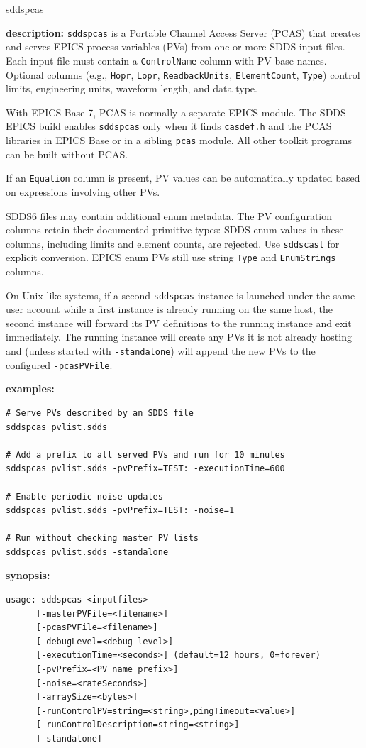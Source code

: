 %
%
\begin{sddsprog}{sddspcas}
\item \textbf{description:}
\verb+sddspcas+ is a Portable Channel Access Server (PCAS) that creates and serves EPICS process variables (PVs)
from one or more SDDS input files. Each input file must contain a \verb+ControlName+ column with PV base names.
Optional columns (e.g., \verb+Hopr+, \verb+Lopr+, \verb+ReadbackUnits+, \verb+ElementCount+, \verb+Type+) control
limits, engineering units, waveform length, and data type.

With EPICS Base 7, PCAS is normally a separate EPICS module. The SDDS-EPICS
build enables \verb+sddspcas+ only when it finds \verb+casdef.h+ and the PCAS
libraries in EPICS Base or in a sibling \verb+pcas+ module. All other toolkit
programs can be built without PCAS.

If an \verb+Equation+ column is present, PV values can be automatically updated based on expressions involving
other PVs.

SDDS6 files may contain additional enum metadata. The PV configuration columns
retain their documented primitive types: SDDS enum values in these columns,
including limits and element counts, are rejected. Use \verb+sddscast+ for
explicit conversion. EPICS enum PVs still use string \verb+Type+ and
\verb+EnumStrings+ columns.

On Unix-like systems, if a second \verb+sddspcas+ instance is launched under the same user account while a first instance
is already running on the same host, the second instance will forward its PV definitions to the running instance and
exit immediately. The running instance will create any PVs it is not already hosting and (unless started with
\verb+-standalone+) will append the new PVs to the configured \verb+-pcasPVFile+.

\item \textbf{examples:}
\begin{verbatim}
# Serve PVs described by an SDDS file
sddspcas pvlist.sdds

# Add a prefix to all served PVs and run for 10 minutes
sddspcas pvlist.sdds -pvPrefix=TEST: -executionTime=600

# Enable periodic noise updates
sddspcas pvlist.sdds -pvPrefix=TEST: -noise=1

# Run without checking master PV lists
sddspcas pvlist.sdds -standalone
\end{verbatim}

\item \textbf{synopsis:}
\begin{verbatim}
usage: sddspcas <inputfiles>
      [-masterPVFile=<filename>]
      [-pcasPVFile=<filename>]
      [-debugLevel=<debug level>]
      [-executionTime=<seconds>] (default=12 hours, 0=forever)
      [-pvPrefix=<PV name prefix>]
      [-noise=<rateSeconds>]
      [-arraySize=<bytes>]
      [-runControlPV=string=<string>,pingTimeout=<value>]
      [-runControlDescription=string=<string>]
      [-standalone]
\end{verbatim}


\end{sddsprog}
